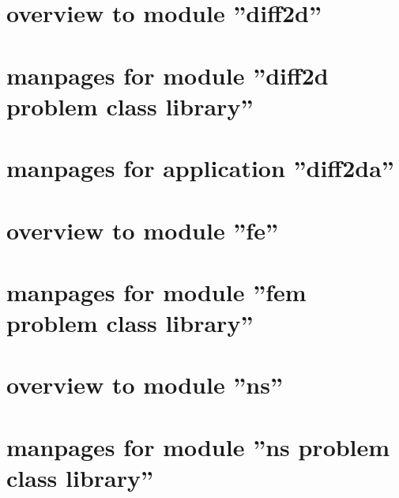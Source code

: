 \newpage
{
\small
\tableofcontents
}
\clearpage

\thispagestyle{plain}
\section{overview to module ''diff2d''}
\renewcommand{\sectitle}{diff2d}


\thispagestyle{plain}
\section{manpages for module ''diff2d problem class library''}
\renewcommand{\sectitle}{diff2d pclib}


\thispagestyle{plain}
\section{manpages for application ''diff2da''}
\renewcommand{\sectitle}{application diff2da}


\thispagestyle{plain}
\section{overview to module ''fe''}
\renewcommand{\sectitle}{fe}


\thispagestyle{plain}
\section{manpages for module ''fem problem class library''}
\renewcommand{\sectitle}{fe pclib}


%

\thispagestyle{plain}
\section{overview to module ''ns''}
\renewcommand{\sectitle}{ns}


\thispagestyle{plain}
\section{manpages for module ''ns problem class library''}
\renewcommand{\sectitle}{ns pclib}


%




